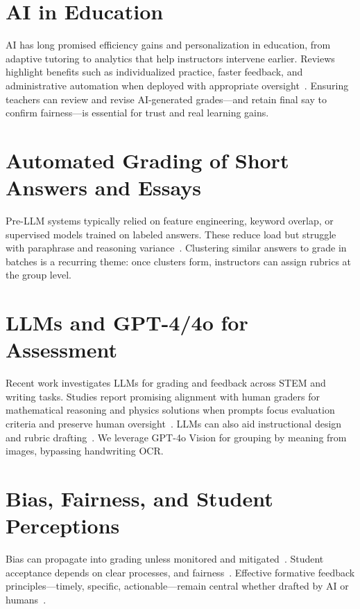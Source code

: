 \documentclass[ms,twoside,print]{nuthesis}
\begin{document}
\section{AI in Education}

AI has long promised efficiency gains and personalization in education, from adaptive tutoring to analytics that help instructors intervene earlier. Reviews highlight benefits such as individualized practice, faster feedback, and administrative automation when deployed with appropriate oversight~\cite{Alto2023,Chen2020,Luckin2016,Zawacki2019}. Ensuring teachers can review and revise AI-generated grades—and retain final say to confirm fairness—is essential for trust and real learning gains.

\section{Automated Grading of Short Answers and Essays}
Pre-LLM systems typically relied on feature engineering, keyword overlap, or supervised models trained on labeled answers. These reduce load but struggle with paraphrase and reasoning variance~\cite{Weegar2022,Konnecke2020}. Clustering similar answers to grade in batches is a recurring theme: once clusters form, instructors can assign rubrics at the group level.

\section{LLMs and GPT-4/4o for Assessment}
Recent work investigates LLMs for grading and feedback across STEM and writing tasks. Studies report promising alignment with human graders for mathematical reasoning and physics solutions when prompts focus evaluation criteria and preserve human oversight~\cite{Liu2023,Kortemeyer2023,Kortemeyer2023b}. LLMs can also aid instructional design and rubric drafting~\cite{Lund2023}. We leverage GPT-4o Vision for grouping by meaning from images, bypassing handwriting OCR.

\section{Bias, Fairness, and Student Perceptions}
Bias can propagate into grading unless monitored and mitigated~\cite{Mehrabi2021}. Student acceptance depends on clear processes, and fairness~\cite{Tossell2023}. Effective formative feedback principles—timely, specific, actionable—remain central whether drafted by AI or humans~\cite{Nicol2006}.
\end{document}
